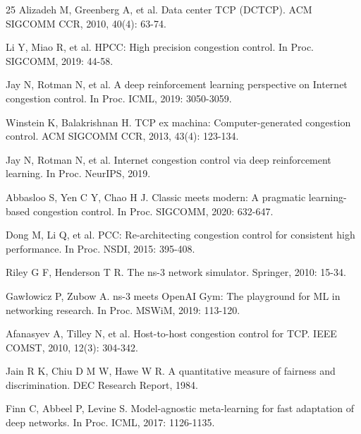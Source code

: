 \documentclass[10pt,twocolumn]{article}
\begin{document}
{\begin{thebibliography}{25}
Alizadeh M, Greenberg A, et al. Data center TCP (DCTCP). ACM SIGCOMM CCR, 2010, 40(4): 63-74.

Li Y, Miao R, et al. HPCC: High precision congestion control. In Proc. SIGCOMM, 2019: 44-58.

Jay N, Rotman N, et al. A deep reinforcement learning perspective on Internet congestion control. In Proc. ICML, 2019: 3050-3059.

Winstein K, Balakrishnan H. TCP ex machina: Computer-generated congestion control. ACM SIGCOMM CCR, 2013, 43(4): 123-134.

Jay N, Rotman N, et al. Internet congestion control via deep reinforcement learning. In Proc. NeurIPS, 2019.

Abbasloo S, Yen C Y, Chao H J. Classic meets modern: A pragmatic learning-based congestion control. In Proc. SIGCOMM, 2020: 632-647.

Dong M, Li Q, et al. PCC: Re-architecting congestion control for consistent high performance. In Proc. NSDI, 2015: 395-408.

Riley G F, Henderson T R. The ns-3 network simulator. Springer, 2010: 15-34.

Gaw\l{}owicz P, Zubow A. ns-3 meets OpenAI Gym: The playground for ML in networking research. In Proc. MSWiM, 2019: 113-120.

Afanasyev A, Tilley N, et al. Host-to-host congestion control for TCP. IEEE COMST, 2010, 12(3): 304-342.

Jain R K, Chiu D M W, Hawe W R. A quantitative measure of fairness and discrimination. DEC Research Report, 1984.

Finn C, Abbeel P, Levine S. Model-agnostic meta-learning for fast adaptation of deep networks. In Proc. ICML, 2017: 1126-1135.

\end{thebibliography}
}
\end{document}
